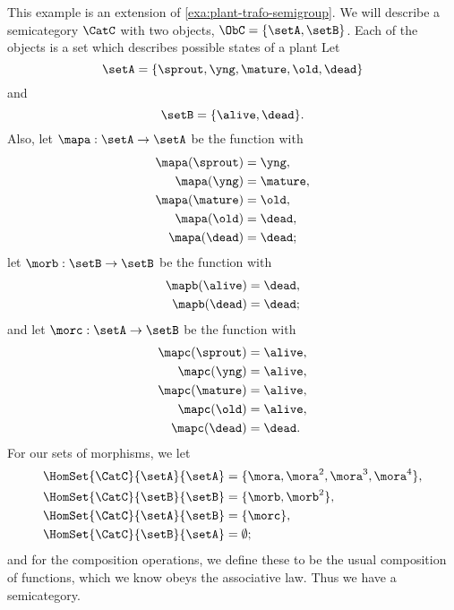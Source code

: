 \begin{example}
	\label{exa:semicat-plant-states}
	This example is an extension of \cref{exa:plant-trafo-semigroup}.
	We will describe a semicategory $\CatC$ with two objects, $\ObC = \{ \setA, \setB \}$.
	Each of the objects is a set which describes possible states of a plant
	Let
	\begin{equation}
		\setA = \{ \sprout, \yng, \mature, \old, \dead \}
	\end{equation}
	and
	\begin{equation}
		\setB = \{ \alive, \dead \}.
	\end{equation}
	Also, let $\mapa : \setA \to \setA$ be the function with
	\begin{align*}
		\mapa(\sprout) & =  \yng,    \\
		\mapa(\yng)    & =  \mature, \\
		\mapa(\mature) & =  \old,    \\
		\mapa( \old)   & = \dead,    \\
		\mapa (\dead)  & = \dead;
	\end{align*}
	let $\morb : \setB \to \setB$ be the function with
	\begin{align*}
		\mapb(\alive) & =  \dead, \\
		\mapb(\dead)  & =  \dead;
	\end{align*}
	and let $\morc : \setA \to \setB$ be the function with
	\begin{align*}
		\mapc(\sprout) & = \alive,  \\
		\mapc(\yng)    & =  \alive, \\
		\mapc(\mature) & = \alive , \\
		\mapc( \old)   & = \alive,  \\
		\mapc (\dead)  & = \dead.
	\end{align*}
	For our sets of morphisms, we let
	\begin{align*}
		\HomSet{\CatC}{\setA}{\setA} & = \{ \mora, \mora^2, \mora^3, \mora^4 \}, \\
		\HomSet{\CatC}{\setB}{\setB} & =  \{ \morb, \morb^2 \},                  \\
		\HomSet{\CatC}{\setA}{\setB} & =  \{ \morc \},                           \\
		\HomSet{\CatC}{\setB}{\setA} & = \emptyset;
	\end{align*}
	and for the composition operations, we define these to be the usual composition of functions, which we know obeys the associative law.
	Thus we have a semicategory.
\end{example}

